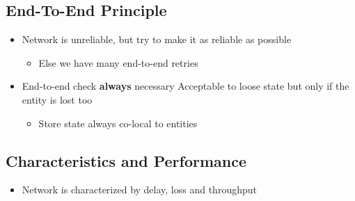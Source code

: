\subsection{End-To-End Principle}
\begin{itemize}
    \item Network is unreliable, but try to make it as reliable as possible
        \begin{itemize}
            \item Else we have many end-to-end retries
        \end{itemize}
    \item End-to-end check \textbf{always} necessary
     Acceptable to loose state but only if the entity is lost too
        \begin{itemize}
            \item Store state always co-local to entities
        \end{itemize}
\end{itemize}

\subsection{Characteristics and Performance}
\begin{itemize}
    \item Network is characterized by delay, loss and throughput
\end{itemize}

